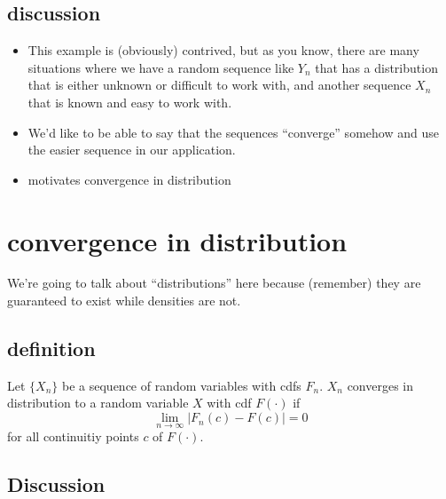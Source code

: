\subsection{discussion}

\begin{itemize}
\item This example is (obviously) contrived, but as you know, there are
       many situations where we have a random sequence like $Y_n$ that
       has a distribution that is either unknown or difficult to work
       with, and another sequence $X_n$ that is known and easy to work
       with.
\item We'd like to be able to say that the sequences ``converge'' somehow
       and use the easier sequence in our application.
\item motivates convergence in distribution
\end{itemize}

\section{convergence in distribution}

    We're going to talk about ``distributions'' here because (remember)
    they are guaranteed to exist while densities are not.

\subsection{definition}

     Let $\{X_n\}$ be a sequence of random variables with cdfs $F_n$.
     $X_n$ converges in distribution to a random variable $X$ with cdf
     $F(·)$ if 
     \[ \lim_{n → ∞} \lvert F_n(c) - F(c) \rvert = 0 \]
     for all continuitiy points $c$ of $F(·)$.

\subsection{Discussion}

